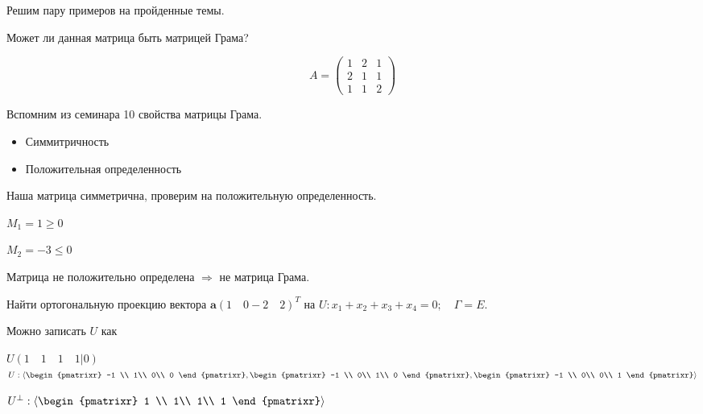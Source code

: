 Решим пару примеров на пройденные темы.
\begin{prim}
Может ли данная матрица быть матрицей Грама?

$$A=\left(\begin{array}{rrr}
    1 & 2&1 \\
     2&1&1\\
     1&1&2
\end{array}\right)$$
\end{prim}
Вспомним из семинара 10 свойства матрицы Грама.
\begin{itemize}
    \item Симмитричность 
    \item Положительная определенность
\end{itemize}

Наша матрица симметрична, проверим на положительную определенность.

$M_1=1\geq0 $

$M_2=-3\leq0$

Матрица не положительно определена $\Rightarrow$ не матрица Грама.

\begin{prim}
Найти ортогональную проекцию вектора $\textbf{a} (1\quad 0 -2 \quad2)^T$ на $U: x_1+x_2+x_3+x_4=0;\quad \Gamma =E$.
\end{prim}
Можно записать $U$ как

$U(1\quad1\quad1\quad1|0)$\qquad $U:\langle \begin{pmatrixr}
     -1 \\
      1\\
      0\\
      0
\end{pmatrixr},\begin{pmatrixr}
     -1 \\
      0\\
      1\\
      0
\end{pmatrixr},\begin{pmatrixr}
     -1 \\
      0\\
      0\\
      1
\end{pmatrixr}\rangle$

$U^{\perp}:\langle\begin{pmatrixr}
     1 \\
     1\\
     1\\
      1
\end{pmatrixr}\rangle$
\vspace{2mm}

